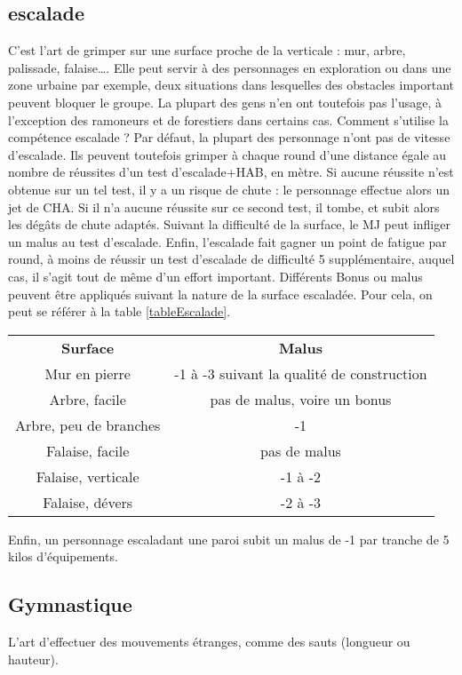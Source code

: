 \documentclass[10pt,a4paper,twocolumn]{book}
\begin{document}
\subsection*{escalade}
C’est l’art de grimper sur une surface proche de la verticale : mur, arbre, palissade, falaise…. Elle peut servir à des personnages en exploration ou dans une zone urbaine par exemple, deux situations dans lesquelles des obstacles important peuvent bloquer le groupe. La plupart des gens n’en ont toutefois pas l’usage, à l’exception des ramoneurs et de forestiers dans certains cas.
Comment s’utilise la compétence escalade ?
Par défaut, la plupart des personnage n’ont pas de vitesse d’escalade. Ils peuvent toutefois grimper à chaque round d’une distance égale au nombre de réussites d’un test d’escalade+HAB, en mètre.
Si aucune réussite n’est obtenue sur un tel test, il y a un risque de chute : le personnage effectue alors un jet de CHA. Si il n’a aucune réussite sur ce second test, il tombe, et subit alors les dégâts de chute adaptés.
Suivant la difficulté de la surface, le MJ peut infliger un malus au test d’escalade.
Enfin, l’escalade fait gagner un point de fatigue par round, à moins de réussir un test d’escalade de difficulté 5 supplémentaire, auquel cas, il s’agit tout de même d’un effort important.
Différents Bonus ou malus peuvent être appliqués suivant la nature de la surface escaladée. Pour cela, on peut se référer à la table \ref{tableEscalade}.
\begin{table*}
\caption{ Surfaces d'escalade :}
\label{tableEscalade}
\begin{center}
\begin{tabular}{cc}
\textbf{Surface} & \textbf{Malus} \\
   Mur en pierre & -1 à -3 suivant la qualité de construction\\
   Arbre, facile & pas de malus, voire un bonus\\
   Arbre, peu de branches & -1\\
   Falaise, facile & pas de malus\\
   Falaise, verticale & -1 à -2\\
   Falaise, dévers & -2 à -3\\
\end{tabular}
\end{center}
\end{table*}

Enfin, un personnage escaladant une paroi subit un malus de -1 par tranche de 5 kilos d’équipements.
\subsection*{Gymnastique}
L’art d’effectuer des mouvements étranges, comme des sauts (longueur ou hauteur).
\end{document}
